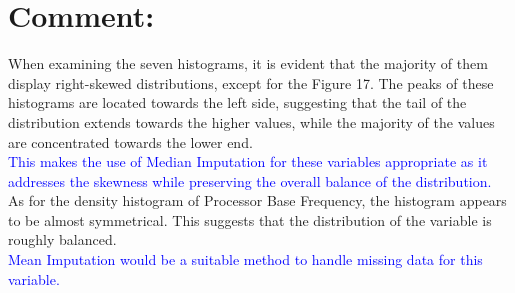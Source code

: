 \documentclass[a4paper]{article}
\begin{document}
	\section*{Comment:}
	When examining the seven histograms, it is evident that the majority of them display right-skewed distributions, except for the Figure 17. The peaks of these histograms are located towards the left side, suggesting that the tail of the distribution extends towards the higher values, while the majority of the values are concentrated towards the lower end. \\
	\textcolor{blue}{This makes the use of Median Imputation for these variables appropriate as it addresses the skewness while preserving the overall balance of the distribution.}\\
	As for the density histogram of Processor Base Frequency, the histogram appears to be almost symmetrical. This suggests that the distribution of the variable is roughly balanced.\\
	\textcolor{blue}{Mean Imputation would be a suitable method to handle missing data for this variable.}
\end{document}
